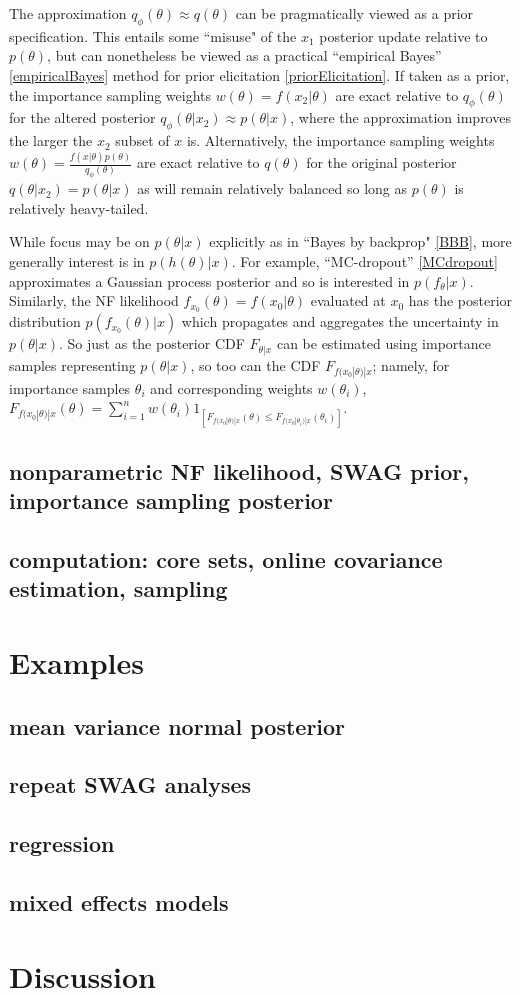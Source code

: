 \documentclass[11pt, oneside]{article}   	%
\begin{document}
The approximation $q_\phi(\theta) \approx q(\theta)$ can be pragmatically viewed as a prior specification.  This entails some ``misuse" of the $x_1$ posterior update relative to $p(\theta)$, but can nonetheless be viewed as a practical ``empirical Bayes'' \ref{empiricalBayes} method for prior elicitation \ref{priorElicitation}. If taken as a prior, the importance sampling weights $w(\theta) = f(x_2|\theta)$ are exact relative to $q_\phi(\theta)$ for the altered posterior $q_\phi(\theta|x_2) \approx p(\theta|x)$, where the approximation improves the larger the $x_2$ subset of $x$ is. 
Alternatively, the importance sampling weights $w(\theta) = \frac{f(x|\theta)p(\theta)}{q_\phi(\theta)}$ are exact relative to $q(\theta)$ for the original posterior $q(\theta|x_2) = p(\theta|x)$ as will remain relatively balanced so long as $p(\theta)$ is relatively heavy-tailed. 

While focus may be on $p(\theta|x)$ explicitly as in ``Bayes by backprop" \ref{BBB}, more generally interest is in $p\left(h(\theta) | x \right)$.   For example, ``MC-dropout'' \ref{MCdropout} approximates a Gaussian process posterior and so is interested in $p\left( f_\theta | x \right)$.  Similarly, the NF likelihood $f_{x_0}(\theta) = f(x_0 | \theta) $ evaluated at $x_0$ has the posterior distribution  $p\left( f_{x_0}(\theta) | x \right)$ which propagates and aggregates the uncertainty in $p(\theta|x)$.
So just as the posterior CDF $F_{\theta|x}$ can be estimated using importance samples representing $p(\theta|x)$, so too can the CDF $F_{f(x_0 | \theta)|x}$; namely, for importance samples $\theta_i$ and corresponding weights $w(\theta_i)$, $F_{f(x_0 | \theta)|x}(\theta) = \sum_{i=1}^n w(\theta_i) 1_{[F_{f(x_0 | \theta)|x}(\theta) \leq F_{f(x_0 | \theta_i)|x}(\theta_i)]}$.







\subsection{nonparametric NF likelihood, SWAG prior, importance sampling posterior}
\subsection{computation: core sets, online covariance estimation, sampling}

\section{Examples}
\subsection{mean variance normal posterior}
\subsection{repeat SWAG analyses}
\subsection{regression}
\subsection{mixed effects models}

\section{Discussion}
\end{document}
